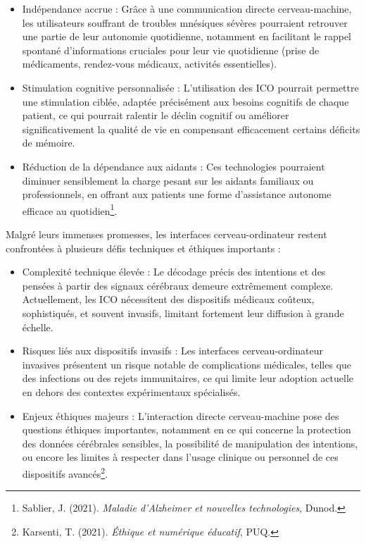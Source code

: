 \documentclass[12pt,a4paper]{report}
\begin{document}
\begin{itemize}

    \item Indépendance accrue :
Grâce à une communication directe cerveau-machine, les utilisateurs souffrant de troubles mnésiques sévères pourraient retrouver une partie de leur autonomie quotidienne, notamment en facilitant le rappel spontané d’informations cruciales pour leur vie quotidienne (prise de médicaments, rendez-vous médicaux, activités essentielles).

    \item Stimulation cognitive personnalisée :
L’utilisation des ICO pourrait permettre une stimulation ciblée, adaptée précisément aux besoins cognitifs de chaque patient, ce qui pourrait ralentir le déclin cognitif ou améliorer significativement la qualité de vie en compensant efficacement certains déficits de mémoire.

    \item Réduction de la dépendance aux aidants :
Ces technologies pourraient diminuer sensiblement la charge pesant sur les aidants familiaux ou professionnels, en offrant aux patients une forme d’assistance autonome efficace au quotidien\footnote{Sablier, J. (2021). \textit{Maladie d’Alzheimer et nouvelles technologies}, Dunod.}.
 
\end{itemize}

Malgré leurs immenses promesses, les interfaces cerveau-ordinateur restent confrontées à plusieurs défis techniques et éthiques importants :

\begin{itemize}

    \item Complexité technique élevée :
Le décodage précis des intentions et des pensées à partir des signaux cérébraux demeure extrêmement complexe. Actuellement, les ICO nécessitent des dispositifs médicaux coûteux, sophistiqués, et souvent invasifs, limitant fortement leur diffusion à grande échelle.

    \item Risques liés aux dispositifs invasifs :
Les interfaces cerveau-ordinateur invasives présentent un risque notable de complications médicales, telles que des infections ou des rejets immunitaires, ce qui limite leur adoption actuelle en dehors des contextes expérimentaux spécialisés.

    \item Enjeux éthiques majeurs :
L’interaction directe cerveau-machine pose des questions éthiques importantes, notamment en ce qui concerne la protection des données cérébrales sensibles, la possibilité de manipulation des intentions, ou encore les limites à respecter dans l’usage clinique ou personnel de ces dispositifs avancés\footnote{Karsenti, T. (2021). \textit{Éthique et numérique éducatif}, PUQ.}.

\end{itemize}
\end{document}
